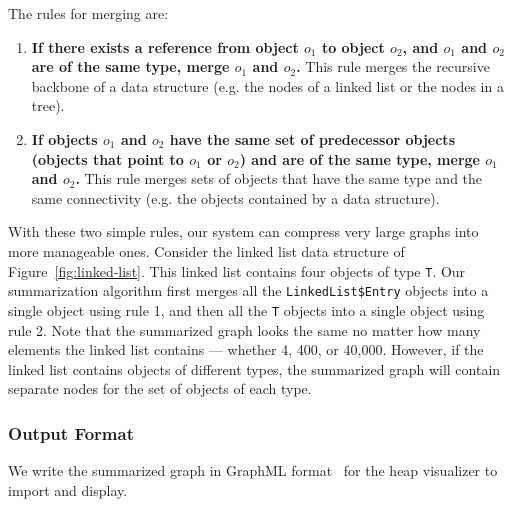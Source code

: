 The rules for merging are:
\begin{enumerate}
\item \textbf{If there exists a reference from object $o_1$ to object $o_2$, 
and $o_1$ and $o_2$ are of the same type, merge $o_1$ and $o_2$.} This rule
merges the recursive backbone of a data structure (e.g. the nodes of a 
linked list or the nodes in a tree).
\item \textbf{If objects $o_1$ and $o_2$ have the same set of predecessor 
objects (objects that point to $o_1$ or $o_2$) and are of the same type, 
merge $o_1$ and $o_2$.}
This rule merges sets of objects that have the same type and the same
connectivity (e.g. the objects contained by a data structure).
\end{enumerate}

With these two simple rules, our system can compress very large graphs into
more manageable ones.  Consider the linked list data structure of
Figure~\ref{fig:linked-list}.  This linked list contains four objects of type
\texttt{T}.  Our summarization algorithm first merges all the
\texttt{LinkedList\$Entry} objects into a single object using rule 1, and then
all the \texttt{T} objects into a single object using rule 2.   Note that the
summarized graph looks the same no matter how many elements the linked list
contains --- whether 4, 400, or 40,000.  However, if the linked list contains
objects of different types, the summarized graph will contain separate nodes
for the set of objects of each type.  


\subsubsection{Output Format}

We write the summarized graph in GraphML format~\cite{graphml} for the 
heap visualizer to import and display.

